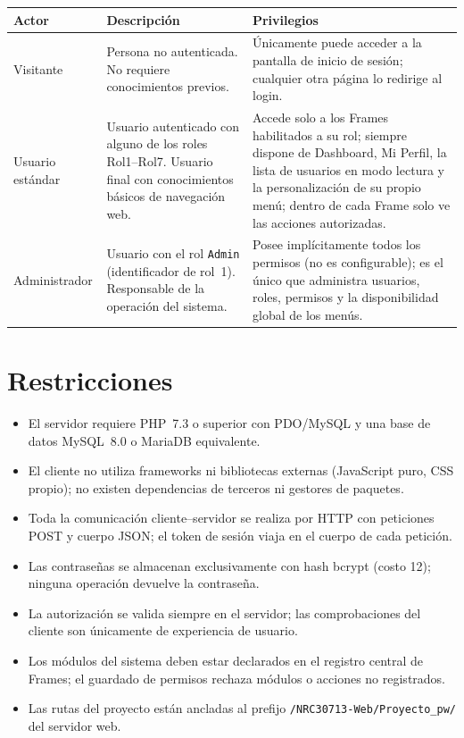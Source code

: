 \begin{longtable}{|p{2.6cm}|p{5.6cm}|p{5.9cm}|}
\hline
\rowcolor{azulcorp!15} \textbf{Actor} & \textbf{Descripción} &
\textbf{Privilegios} \\ \hline
\endhead
Visitante & Persona no autenticada. No requiere conocimientos previos. &
  Únicamente puede acceder a la pantalla de inicio de sesión; cualquier otra
  página lo redirige al login. \\ \hline
Usuario estándar & Usuario autenticado con alguno de los roles Rol1--Rol7.
  Usuario final con conocimientos básicos de navegación web. &
  Accede solo a los Frames habilitados a su rol; siempre dispone de
  Dashboard, Mi Perfil, la lista de usuarios en modo lectura y la
  personalización de su propio menú; dentro de cada Frame solo ve las
  acciones autorizadas. \\ \hline
Administrador & Usuario con el rol \texttt{Admin} (identificador de rol~1).
  Responsable de la operación del sistema. &
  Posee implícitamente todos los permisos (no es configurable); es el único
  que administra usuarios, roles, permisos y la disponibilidad global de los
  menús. \\ \hline
\end{longtable}

\section{Restricciones}

\begin{itemize}
    \item El servidor requiere PHP~7.3 o superior con PDO/MySQL y una base
          de datos MySQL~8.0 o MariaDB equivalente.
    \item El cliente no utiliza frameworks ni bibliotecas externas
          (JavaScript puro, CSS propio); no existen dependencias de
          terceros ni gestores de paquetes.
    \item Toda la comunicación cliente--servidor se realiza por HTTP con
          peticiones POST y cuerpo JSON; el token de sesión viaja en el
          cuerpo de cada petición.
    \item Las contraseñas se almacenan exclusivamente con hash bcrypt
          (costo 12); ninguna operación devuelve la contraseña.
    \item La autorización se valida siempre en el servidor; las
          comprobaciones del cliente son únicamente de experiencia de
          usuario.
    \item Los módulos del sistema deben estar declarados en el registro
          central de Frames; el guardado de permisos rechaza módulos o
          acciones no registrados.
    \item Las rutas del proyecto están ancladas al prefijo
          \texttt{/NRC30713-Web/Proyecto\_pw/} del servidor web.
\end{itemize}


